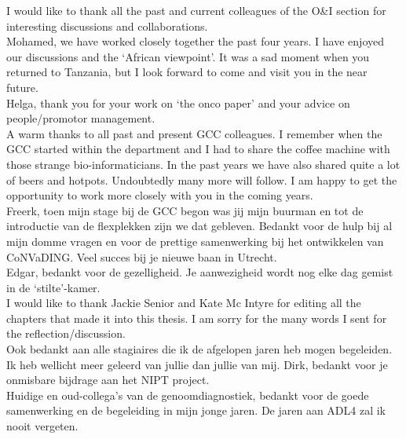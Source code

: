 \begin{appendices}
	\noindent I would like to thank all the past and current colleagues of the O\&I section for interesting discussions and collaborations.\\ 
	
	\noindent Mohamed, we have worked closely together the past four years. I have enjoyed our discussions and the ‘African viewpoint’. It was a sad moment when you returned to Tanzania, but I look forward to come and visit you in the near future.\\
	
	\noindent Helga, thank you for your work on ‘the onco paper’ and your advice on people/promotor management.\\
	
	\noindent A warm thanks to all past and present GCC colleagues. I remember when the GCC started within the department and I had to share the coffee machine with those strange bio-informaticians. In the past years we have also shared quite a lot of beers and hotpots. Undoubtedly many more will follow. I am happy to get the opportunity to work more closely with you in the coming years.\\
	
	\noindent Freerk, toen mijn stage bij de GCC begon was jij mijn buurman en tot de introductie van de flexplekken zijn we dat gebleven. Bedankt voor de hulp bij al mijn domme vragen en voor de prettige samenwerking bij het ontwikkelen van CoNVaDING. Veel succes bij je nieuwe baan in Utrecht.\\
	
	\noindent Edgar, bedankt voor de gezelligheid. Je aanwezigheid wordt nog elke dag gemist in de ‘stilte’-kamer.\\
	
	\noindent I would like to thank Jackie Senior and Kate Mc Intyre for editing all the chapters that made it into this thesis. I am sorry for the many words I sent for the reflection/discussion.\\ 
	
	\noindent Ook bedankt aan alle stagiaires die ik de afgelopen jaren heb mogen begeleiden. Ik heb wellicht meer geleerd van jullie dan jullie van mij. Dirk, bedankt voor je onmisbare bijdrage aan het NIPT project.\\
	
	\noindent Huidige en oud-collega’s van de genoomdiagnostiek, bedankt voor de goede samenwerking en de begeleiding in mijn jonge jaren. De jaren aan ADL4 zal ik nooit vergeten.\\
	

\end{appendices}
